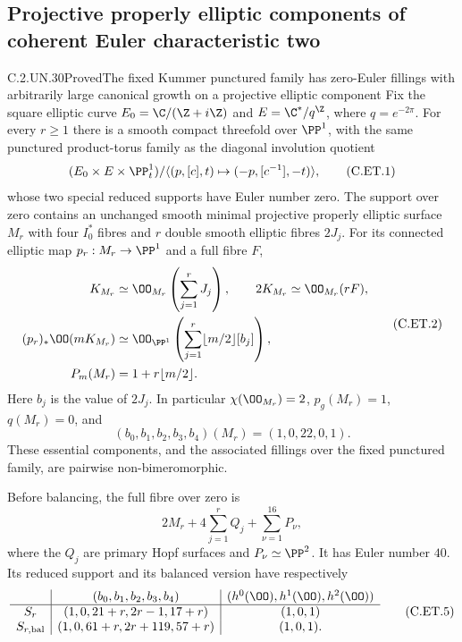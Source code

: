 \subsection{Projective properly elliptic components of coherent Euler characteristic two}

\begin{statement}{C.2.UN.30}{Proved}{The fixed Kummer punctured family has zero-Euler fillings with arbitrarily large canonical growth on a projective elliptic component}
Fix the square elliptic curve
$E_0=\C/(\Z+i\Z)$ and $E=\C^*/q^{\Z}$,
where $q=e^{-2\pi}$. For every $r\ge1$ there is
a smooth compact threefold over $\PP^1$,
with the same punctured product-torus family
as the diagonal involution quotient
\[
 (E_0\times E\times\PP^1_t)/
      \langle(p,[c],t)\mapsto(-p,[c^{-1}],-t)\rangle,
                                                               \tag{C.ET.1}
\]
whose two special reduced supports have Euler
number zero. The support over zero contains an
unchanged smooth minimal projective properly
elliptic surface $M_r$ with four $I_0^*$ fibres
and $r$ double smooth elliptic fibres $2J_j$.
For its connected elliptic map $p_r:M_r\to\PP^1$
and a full fibre $F$,
\[
 \begin{aligned}
 K_{M_r}&\simeq\OO_{M_r}\left(\sum_{j=1}^rJ_j\right),
 \qquad 2K_{M_r}\simeq\OO_{M_r}(rF),\\
 (p_r)_*\OO(mK_{M_r})
   &\simeq\OO_{\PP^1}\left(
                \sum_{j=1}^r\lfloor m/2\rfloor[b_j]\right),
 \\
 P_m(M_r)&=1+r\lfloor m/2\rfloor .
 \end{aligned}                                             \tag{C.ET.2}
\]
Here $b_j$ is the value of $2J_j$. In particular
$\chi(\OO_{M_r})=2$, $p_g(M_r)=1$, $q(M_r)=0$,
and
\[
            (b_0,b_1,b_2,b_3,b_4)(M_r)
                         =(1,0,22,0,1).              \tag{C.ET.3}
\]
These essential components, and the associated
fillings over the fixed punctured family, are
pairwise non-bimeromorphic.

Before balancing, the full fibre over zero is
\[
                  2M_r+4\sum_{j=1}^rQ_j
                           +\sum_{\nu=1}^{16}P_\nu,
                                                               \tag{C.ET.4}
\]
where the $Q_j$ are primary Hopf surfaces and
$P_\nu\simeq\PP^2$. It has Euler number $40$.
Its reduced support and its balanced version
have respectively
\[
 \begin{array}{c|c|c}
 &(b_0,b_1,b_2,b_3,b_4)&
                 (h^0(\OO),h^1(\OO),h^2(\OO))\\ \hline
 S_r&(1,0,21+r,2r-1,17+r)&(1,0,1)\\
 S_{r,\mathrm{bal}}&(1,0,61+r,2r+119,57+r)&(1,0,1).
 \end{array}                                             \tag{C.ET.5}
\]
\end{statement}
